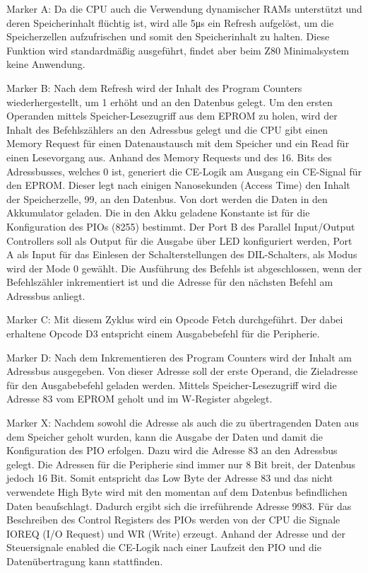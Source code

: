Marker A: Da die CPU auch die Verwendung dynamischer RAMs unterstützt und deren Speicherinhalt flüchtig ist, wird alle 5μs ein Refresh aufgelöst, um die Speicherzellen aufzufrischen und somit den Speicherinhalt zu halten. Diese Funktion wird standardmäßig ausgeführt, findet aber beim Z80 Minimalsystem keine Anwendung.

Marker B: Nach dem Refresh wird der Inhalt des Program Counters wiederhergestellt, um 1 erhöht und an den Datenbus gelegt. Um den ersten Operanden mittels Speicher-Lesezugriff aus dem EPROM zu holen, wird der Inhalt des Befehlszählers an den Adressbus gelegt und die CPU gibt einen Memory Request für einen Datenaustausch mit dem Speicher und ein Read für einen Lesevorgang aus. Anhand des Memory Requests und des 16. Bits des Adressbusses, welches 0 ist, generiert die CE-Logik am Ausgang ein CE-Signal für den EPROM. Dieser legt nach einigen Nanosekunden (Access Time) den Inhalt der Speicherzelle, 99, an den Datenbus. Von dort werden die Daten in den Akkumulator geladen. Die in den Akku geladene Konstante ist für die Konfiguration des PIOs (8255) bestimmt. Der Port B des Parallel Input/Output Controllers soll als Output für die Ausgabe über LED konfiguriert werden, Port A als Input für das Einlesen der Schalterstellungen des DIL-Schalters, als Modus wird der Mode 0 gewählt. Die Ausführung des Befehls ist abgeschlossen, wenn der Befehlszähler inkrementiert ist und die Adresse für den nächsten Befehl am Adressbus anliegt.

Marker C: Mit diesem Zyklus wird ein Opcode Fetch durchgeführt. Der dabei erhaltene Opcode D3 entspricht einem Ausgabebefehl für die Peripherie.

Marker D: Nach dem Inkrementieren des Program Counters wird der Inhalt am Adressbus ausgegeben. Von dieser Adresse soll der erste Operand, die Zieladresse für den Ausgabebefehl geladen werden. Mittels Speicher-Lesezugriff wird die Adresse 83 vom EPROM geholt und im W-Register abgelegt.

Marker X: Nachdem sowohl die Adresse als auch die zu übertragenden Daten aus dem Speicher geholt wurden, kann die Ausgabe der Daten und damit die Konfiguration des PIO erfolgen. Dazu wird die Adresse 83 an den Adressbus gelegt. Die Adressen für die Peripherie sind immer nur 8 Bit breit, der Datenbus jedoch 16 Bit. Somit entspricht das Low Byte der Adresse 83 und das nicht verwendete High Byte wird mit den momentan auf dem Datenbus befindlichen Daten beaufschlagt. Dadurch ergibt sich die irreführende Adresse 9983. Für das Beschreiben des Control Registers des PIOs werden von der CPU die Signale IOREQ (I/O Request) und WR (Write) erzeugt. Anhand der Adresse und der Steuersignale enabled die CE-Logik nach einer Laufzeit den PIO und die Datenübertragung kann stattfinden.

